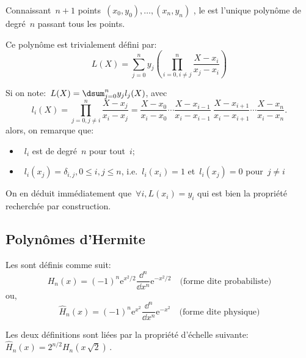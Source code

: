 Connaissant~$n + 1$ points~$(x_0, y_0),\dots,(x_n, y_n)$ , le 
est l'unique polynôme de degré~$n$
passant tous les points.

Ce polynôme est trivialement défini par:
\begin{equation}
L(X) = \sum_{j=0}^{n} y_j \left( \prod_{i=0, i\neq j}^{n} \frac{X-x_i}{x_j-x_i} \right) 
\end{equation}

\medskip
Si on note:~$L(X) = \dsum_{j=0}^{n} y_j l_j(X)$, avec
\begin{equation}
l_i(X) = \prod_{j=0, j\neq i}^{n} \frac{X-x_j}{x_i-x_j} = \frac{X-x_0}{x_i-x_0} \cdots \frac{X-x_{i-1}}{x_i-x_{i-1}} ~ \frac{X-x_{i+1}}{x_i-x_{i+1}} \cdots \frac{X-x_{n}}{x_i-x_{n}}.
\end{equation}
alors, on remarque que:
\begin{itemize}
  \item~$l_i$ est de degré~$n$ pour tout~$i$;
  \item~$l_i(x_j) = \delta_{i,j}, 0 \leq i,j \leq n$, i.e.~$l_i(x_i) = 1$ et~$l_i(x_j) = 0$ pour~$j\ne i$
\end{itemize}

On en déduit immédiatement que~$\forall i, L(x_i) = y_i$ qui est bien la propriété
recherchée par construction.




\medskip
\subsection{Polynômes d'Hermite}

Les  
sont définis comme suit:
\begin{equation}
  H_n(x)=(-1)^n \mathrm{e}^{x^2/2}\frac{\dd^n}{\dd x^n}\mathrm{e}^{-x^2/2} \quad \text{(forme dite probabiliste)}
\end{equation}
ou,
\begin{equation}
  \widehat{H}_n(x)=(-1)^n \mathrm{e}^{x^2}\frac{\dd^n}{\dd x^n}\mathrm{e}^{-x^2} \quad \text{(forme dite physique)}
\end{equation}

Les deux définitions sont liées par la propriété d'échelle suivante: 
$\widehat{H}_n(x) = 2^{n/2}H_n \left(x\,\sqrt{2} \right)\,\!.$

